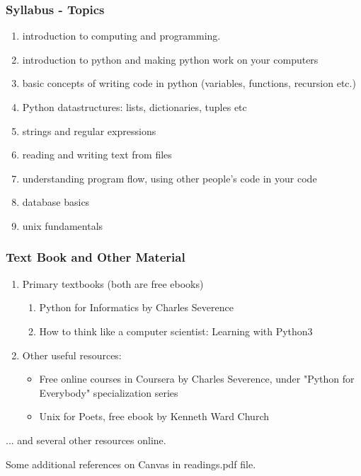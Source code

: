 \documentclass{beamer}
\begin{document}
\begin{frame}
\frametitle{Syllabus - Topics}
\begin{enumerate}
\item introduction to computing and programming.
\item introduction to python and making python work on your computers
\item basic concepts of writing code in python (variables, functions, recursion etc.)
\item Python datastructures: lists, dictionaries, tuples etc
\item strings and regular expressions
\item reading and writing text from files
\item understanding program flow, using other people's code in your code
\item database basics
\item unix fundamentals
\end{enumerate}
\end{frame}

\begin{frame}
\frametitle{Text Book and Other Material}
\begin{enumerate}
\item Primary textbooks (both are free ebooks)
\begin{enumerate}
\item Python for Informatics by Charles Severence
\item How to think like a computer scientist: Learning with Python3
\end{enumerate}
\item Other useful resources:
\begin{itemize}
\item Free online courses in Coursera by Charles Severence, under "Python for Everybody" specialization series
\item Unix for Poets, free ebook by Kenneth Ward Church
\end{itemize}
\end{enumerate}
... and several other resources online. \\ \medskip

Some additional references on Canvas in readings.pdf file.
\end{frame}
\end{document}
